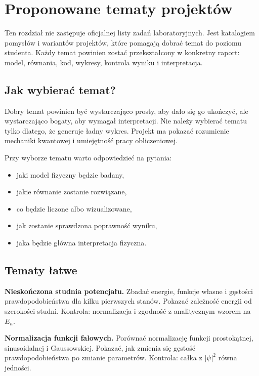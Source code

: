 \chapter{Proponowane tematy projektów}

\begin{summarybox}
Ten rozdział nie zastępuje oficjalnej listy zadań laboratoryjnych. Jest katalogiem
pomysłów i wariantów projektów, które pomagają dobrać temat do poziomu studenta.
Każdy temat powinien zostać przekształcony w konkretny raport: model, równania,
kod, wykresy, kontrola wyniku i interpretacja.
\end{summarybox}

\section{Jak wybierać temat?}

Dobry temat powinien być wystarczająco prosty, aby dało się go ukończyć, ale
wystarczająco bogaty, aby wymagał interpretacji. Nie należy wybierać tematu tylko
dlatego, że generuje ładny wykres. Projekt ma pokazać rozumienie mechaniki
kwantowej i umiejętność pracy obliczeniowej.

Przy wyborze tematu warto odpowiedzieć na pytania:
\begin{itemize}
    \item jaki model fizyczny będzie badany,
    \item jakie równanie zostanie rozwiązane,
    \item co będzie liczone albo wizualizowane,
    \item jak zostanie sprawdzona poprawność wyniku,
    \item jaka będzie główna interpretacja fizyczna.
\end{itemize}

\section{Tematy łatwe}

\begin{exercisebox}
\textbf{Nieskończona studnia potencjału.}
Zbadać energie, funkcje własne i gęstości prawdopodobieństwa dla kilku pierwszych
stanów. Pokazać zależność energii od szerokości studni. Kontrola: normalizacja i
zgodność z analitycznym wzorem na \(E_n\).
\end{exercisebox}

\begin{exercisebox}
\textbf{Normalizacja funkcji falowych.}
Porównać normalizację funkcji prostokątnej, sinusoidalnej i Gaussowskiej. Pokazać,
jak zmienia się gęstość prawdopodobieństwa po zmianie parametrów. Kontrola:
całka z \(|\psi|^2\) równa jedności.
\end{exercisebox}


